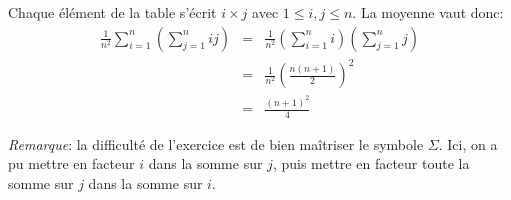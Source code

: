 Chaque élément de la table s’écrit $i\times j$ avec $1\leq i,j\leq n$. La moyenne vaut donc:
\begin{eqnarray}
\frac{1}{n^2}\sum_{i=1}^n{\left(\sum_{j=1}^n{ij}\right)} &=& \frac{1}{n^2}\left(\sum_{i=1}^n{i}\right)\left(\sum_{j=1}^n{j}\right) \nonumber \\
&=& \frac{1}{n^2}\left(\frac{n(n+1)}{2}\right)^2 \nonumber \\
&=& \frac{(n+1)^2}{4} \nonumber 
\end{eqnarray}

\textit{Remarque}: la difficulté de l'exercice est de bien maîtriser le symbole $\Sigma$. Ici, on a pu mettre en facteur $i$ dans la somme sur $j$, puis mettre en facteur toute la somme sur $j$ dans la somme sur $i$.
